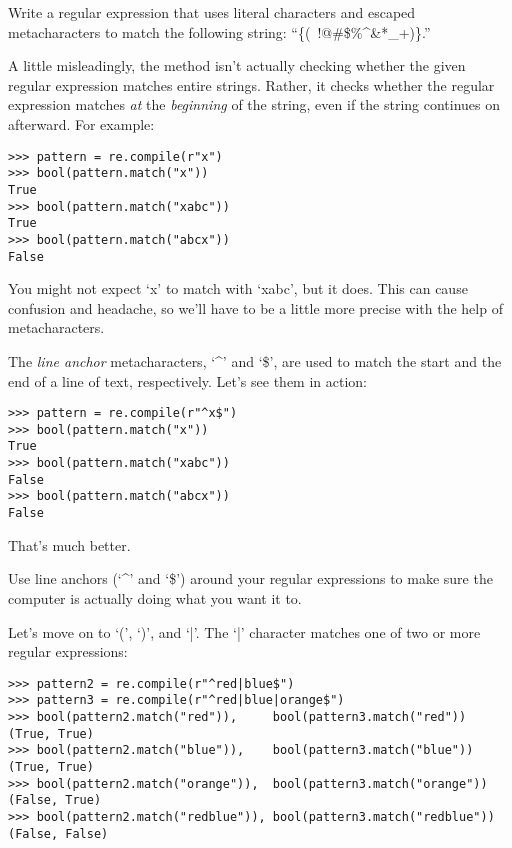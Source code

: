 \begin{problem}
    Write a regular expression that uses literal characters and escaped metacharacters to match the following string: ``\{(~!@#\$\%^&*_+)\}.''
\end{problem}


A little misleadingly, the  method isn't actually checking whether the given regular expression matches entire strings.
Rather, it checks whether the regular expression matches \emph{at} the \emph{beginning} of the string, even if the string continues on afterward.
For example:
\begin{lstlisting}
>>> pattern = re.compile(r"x")
>>> bool(pattern.match("x"))
True
>>> bool(pattern.match("xabc"))
True
>>> bool(pattern.match("abcx"))
False
\end{lstlisting}

You might not expect `x' to match with `xabc', but it does.
This can cause confusion and headache, so we'll have to be a little more precise with the help of metacharacters.

The \emph{line anchor} metacharacters, `^' and `\$', are used to match the start and the end of a line of text, respectively.
Let's see them in action:
\begin{lstlisting}
>>> pattern = re.compile(r"^x$")
>>> bool(pattern.match("x"))
True
>>> bool(pattern.match("xabc"))
False
>>> bool(pattern.match("abcx"))
False
\end{lstlisting}




That's much better.

\begin{Tip}
Use line anchors (`^' and `\$') around your regular expressions to make sure the computer is actually doing what you want it to.
\end{Tip}

Let's move on to `(', `)', and `|'.
The `|' character matches one of two or more regular expressions:
\begin{lstlisting}
>>> pattern2 = re.compile(r"^red|blue$")
>>> pattern3 = re.compile(r"^red|blue|orange$")
>>> bool(pattern2.match("red")),     bool(pattern3.match("red"))
(True, True)
>>> bool(pattern2.match("blue")),    bool(pattern3.match("blue"))
(True, True)
>>> bool(pattern2.match("orange")),  bool(pattern3.match("orange"))
(False, True)
>>> bool(pattern2.match("redblue")), bool(pattern3.match("redblue"))
(False, False)
\end{lstlisting}

